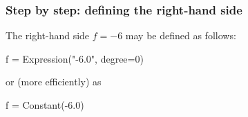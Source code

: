 \begin{frame}[fragile]
  \frametitle{Step by step: defining the right-hand side}

  The right-hand side $f = - 6$ may be defined as follows:
  \begin{python}
f = Expression("-6.0", degree=0)
  \end{python}

  \bigskip

  or (more efficiently) as
  \begin{python}
f = Constant(-6.0)
  \end{python}

\end{frame}
